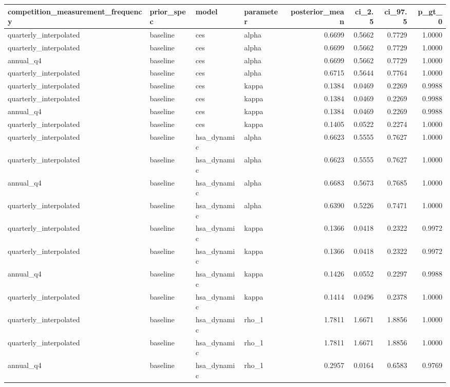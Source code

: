 \begin{tabular}{llllrrrr}
\toprule
competition\_measurement\_frequency & prior\_spec & model & parameter & posterior\_mean & ci\_2.5 & ci\_97.5 & p\_gt\_0 \\
\midrule
quarterly\_interpolated & baseline & ces & alpha & 0.6699 & 0.5662 & 0.7729 & 1.0000 \\
quarterly\_interpolated & baseline & ces & alpha & 0.6699 & 0.5662 & 0.7729 & 1.0000 \\
annual\_q4 & baseline & ces & alpha & 0.6699 & 0.5662 & 0.7729 & 1.0000 \\
quarterly\_interpolated & baseline & ces & alpha & 0.6715 & 0.5644 & 0.7764 & 1.0000 \\
quarterly\_interpolated & baseline & ces & kappa & 0.1384 & 0.0469 & 0.2269 & 0.9988 \\
quarterly\_interpolated & baseline & ces & kappa & 0.1384 & 0.0469 & 0.2269 & 0.9988 \\
annual\_q4 & baseline & ces & kappa & 0.1384 & 0.0469 & 0.2269 & 0.9988 \\
quarterly\_interpolated & baseline & ces & kappa & 0.1405 & 0.0522 & 0.2274 & 1.0000 \\
quarterly\_interpolated & baseline & hsa\_dynamic & alpha & 0.6623 & 0.5555 & 0.7627 & 1.0000 \\
quarterly\_interpolated & baseline & hsa\_dynamic & alpha & 0.6623 & 0.5555 & 0.7627 & 1.0000 \\
annual\_q4 & baseline & hsa\_dynamic & alpha & 0.6683 & 0.5673 & 0.7685 & 1.0000 \\
quarterly\_interpolated & baseline & hsa\_dynamic & alpha & 0.6390 & 0.5226 & 0.7471 & 1.0000 \\
quarterly\_interpolated & baseline & hsa\_dynamic & kappa & 0.1366 & 0.0418 & 0.2322 & 0.9972 \\
quarterly\_interpolated & baseline & hsa\_dynamic & kappa & 0.1366 & 0.0418 & 0.2322 & 0.9972 \\
annual\_q4 & baseline & hsa\_dynamic & kappa & 0.1426 & 0.0552 & 0.2297 & 0.9988 \\
quarterly\_interpolated & baseline & hsa\_dynamic & kappa & 0.1414 & 0.0496 & 0.2378 & 1.0000 \\
quarterly\_interpolated & baseline & hsa\_dynamic & rho\_1 & 1.7811 & 1.6671 & 1.8856 & 1.0000 \\
quarterly\_interpolated & baseline & hsa\_dynamic & rho\_1 & 1.7811 & 1.6671 & 1.8856 & 1.0000 \\
annual\_q4 & baseline & hsa\_dynamic & rho\_1 & 0.2957 & 0.0164 & 0.6583 & 0.9769 \\

\end{tabular}
